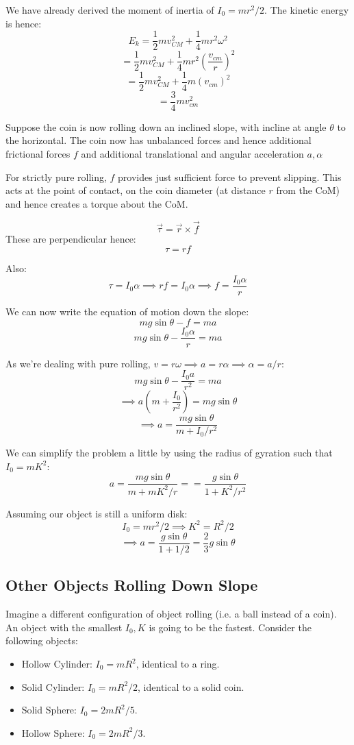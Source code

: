We have already derived the moment of inertia of $I_0 = mr^2/2$. The kinetic energy is hence:
\[
    E_k = \frac{1}{2}mv_{CM}^2 + \frac{1}{4} mr^2 \omega^2
\]
\[
    = \frac{1}{2}mv_{CM}^2 + \frac{1}{4} mr^2 \left(\frac{v_{cm}}{r}\right)^2
\]
\[
    = \frac{1}{2}mv_{CM}^2 + \frac{1}{4} m\left(v_{cm}\right)^2
\]
\[
    = \frac{3}{4}mv_{cm}^2
\]

Suppose the coin is now rolling down an inclined slope, with incline at angle $\theta$ to the horizontal. The coin now has unbalanced forces and hence additional frictional forces $f$ and additional translational and angular acceleration $a, \alpha$

For strictly pure rolling, $f$ provides just sufficient force to prevent slipping. This acts at the point of contact, on the coin diameter (at distance $r$ from the CoM) and hence creates a torque about the CoM.

\[
    \vec{\tau} = \vec{r} \times \vec{f}
\]
These are perpendicular hence:
\[
    \tau = rf
\]

Also:
\[
    \tau = I_0 \alpha \implies rf = I_0 \alpha \implies f = \frac{I_0 \alpha}{r} \tag{1}
\]

We can now write the equation of motion down the slope:
\[
    mg \sin \theta - f = m a
\]
\[
    mg \sin \theta - \frac{I_0 \alpha}{r} = ma
\]

As we're dealing with pure rolling, $v = r \omega \implies a = r \alpha \implies \alpha = a/r$:
\[
    mg \sin \theta - \frac{I_0 a}{r^2} = ma
\]
\[
    \implies a \left(m + \frac{I_0}{r^2}\right) = mg \sin \theta
\]
\[
    \implies a = \frac{mg \sin \theta}{m + I_0 /r^2}
\]

We can simplify the problem a little by using the radius of gyration such that $I_0 = mK^2$:
\[
    a = \frac{mg \sin \theta}{m + mK^2 / r} = = \frac{g \sin \theta}{1 + K^2 / r^2}
\]

Assuming our object is still a uniform disk:
\[
    I_0 = mr^2 / 2 \implies K^2 = R^2/2
\]
\[
    \implies a = \frac{g \sin \theta}{1 + 1/2} = \frac{2}{3} g \sin \theta
\]

\subsection{Other Objects Rolling Down Slope}
Imagine a different configuration of object rolling (i.e. a ball instead of a coin). An object with the smallest $I_0, K$ is going to be the fastest. Consider the following objects:
\begin{itemize}
    \item Hollow Cylinder: $I_0 = mR^2$, identical to a ring.
    \item Solid Cylinder: $I_0 = mR^2 / 2$, identical to a solid coin.
    \item Solid Sphere: $I_0 = 2mR^2/5$.
    \item Hollow Sphere: $I_0 = 2mR^2/3$.
\end{itemize}

